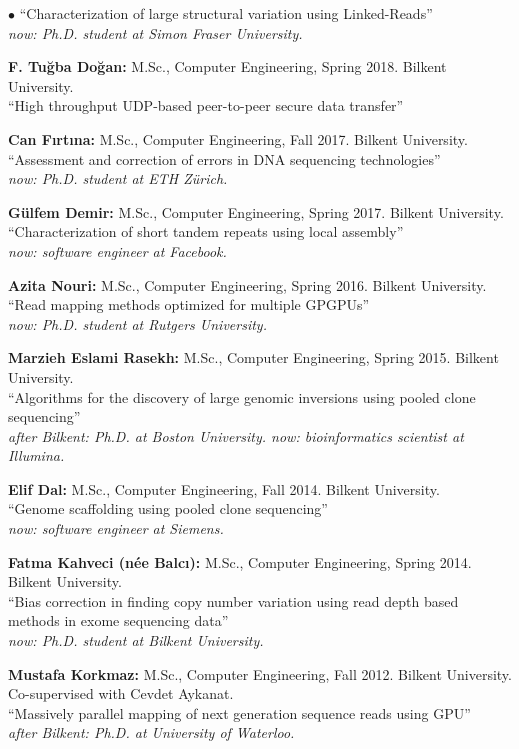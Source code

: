 \documentclass[margin,line]{res}
\newenvironment{list2}{
  \begin{list}{$\bullet$}{%
      \setlength{\itemsep}{0.1cm}
      \setlength{\parsep}{0in} \setlength{\parskip}{0in}
      \setlength{\topsep}{0in} \setlength{\partopsep}{0in} 
      \setlength{\leftmargin}{0.2in}}}{\end{list}}
\begin{document}
\begin{resume}
\begin{list2}
  ``Characterization of large structural variation using Linked-Reads''\\
  {\it now: Ph.D. student at Simon Fraser University.}
\item
  {\bf F. Tuğba Doğan:} M.Sc., Computer Engineering, Spring 2018.
  Bilkent University. \\
  ``High throughput UDP-based peer-to-peer secure data transfer''
\item
  {\bf Can Fırtına:} M.Sc., Computer Engineering,  Fall 2017.
  Bilkent University. \\
  ``Assessment and correction of errors in DNA sequencing technologies''\\
  {\it now: Ph.D. student at ETH Zürich.}
\item
  {\bf Gülfem Demir:} M.Sc., Computer Engineering, Spring 2017.
  Bilkent University. \\
  ``Characterization of short tandem repeats using local assembly''\\
  {\it now: software engineer at Facebook.}
\item
  {\bf Azita Nouri:} M.Sc., Computer Engineering, Spring 2016.
  Bilkent University.\\
  ``Read mapping methods optimized for multiple GPGPUs''\\
  {\it now: Ph.D. student at Rutgers University.}
\item
  {\bf Marzieh Eslami Rasekh:} M.Sc., Computer Engineering, Spring 2015.
  Bilkent University.\\
  ``Algorithms for the discovery of large genomic inversions using pooled clone sequencing''\\
  {\it after Bilkent: Ph.D. at Boston University. now: bioinformatics scientist at Illumina.}
\item
  {\bf Elif Dal:} M.Sc., Computer Engineering, Fall 2014.
  Bilkent University.\\
  ``Genome scaffolding using pooled clone sequencing''\\
  {\it now: software engineer at Siemens.}

\item
  {\bf Fatma Kahveci (n\'{e}e Balc{\i}):} M.Sc., Computer Engineering, Spring 2014.
  Bilkent University.\\
  ``Bias correction in finding copy number variation using read depth based methods in exome sequencing data''\\
  {\it now: Ph.D. student at Bilkent University.}
\item
 {\bf Mustafa Korkmaz:} M.Sc., Computer Engineering, Fall 2012.
  Bilkent University. \\ Co-supervised with Cevdet Aykanat.\\
  ``Massively parallel mapping of next generation sequence reads using GPU''\\
  {\it after Bilkent: Ph.D. at University of Waterloo.}
\end{list2}
\vspace*{-.4cm}

\end{resume}
\end{document}
